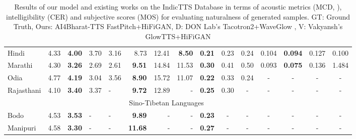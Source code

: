 \documentclass{article}
\begin{document}
\begin{table*}[ht]
\begin{tabular}{@{}lllllrrrccccccc@{}}
Hindi      & 4.33 & \textbf{4.00} & 3.70 & 3.16 & 8.73           & 12.41 & \textbf{8.50} & \textbf{0.21} & 0.23 & 0.24        & 0.104  & \textbf{0.094} & 0.127 & 0.100          \\
Marathi    & 4.30 & \textbf{3.26} & 2.69 & 2.61 & \textbf{9.51}  & 14.84 & 11.53         & \textbf{0.30} & 0.41 & 0.50         & 0.093 & \textbf{0.075} & 0.136 & 1.484          \\
Odia       & 4.77 & \textbf{4.19} & 3.04 & 3.56 & \textbf{8.90}  & 15.72 & 11.07         & \textbf{0.22} & 0.33 & 0.24         & - & -              & -     & -              \\
Rajasthani & 4.10 & \textbf{3.40} & 3.37 & -    & \textbf{9.72}  & 12.89 & -             & \textbf{0.25} & 0.30 & -             & - & -              & -     & -               \\
\midrule
\multicolumn{14}{c}{Sino-Tibetan Languages}                                                                           \\ 
\midrule
Bodo       & 4.53 & \textbf{3.53} & -    & -    & \textbf{9.89}  & -     & -             & \textbf{0.23} & -    & -            & - & -              & -     & -              \\
Manipuri   & 4.58 & \textbf{3.30} & -    & -    & \textbf{11.68} & -     & -             & \textbf{0.27} & -    & -            & - & -              & -     & -              \\
\bottomrule
\end{tabular}
\endgroup
\caption{Results of our model and existing works on the IndicTTS Database in terms of acoustic metrics (MCD, ), intelligibility (CER) and subjective scores (MOS) for evaluating naturalness of generated samples. GT: Ground Truth, Ours: AI4Bharat-TTS FastPitch+HiFiGAN, D: DON Lab's Tacotron2+WaveGlow \cite{prakash2020generic}, V: Vakyansh's GlowTTS+HiFiGAN\cite{vakyansh2021glow}}
\label{tab:main}
\end{table*}
\end{document}

